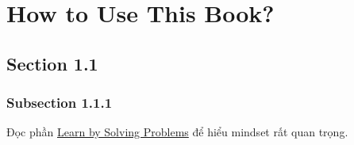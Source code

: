 \documentclass[a4paper]{report}
\begin{document}
\maketitle
\tableofcontents

\chapter{How to Use This Book?}

\section{Section 1.1}

\subsection{Subsection 1.1.1}

Đọc phần \href{https://artofproblemsolving.com/ebooks/prealgebra-ebook/par/154183}{Learn by Solving Problems} để hiểu mindset rất quan trọng.




\end{document}
